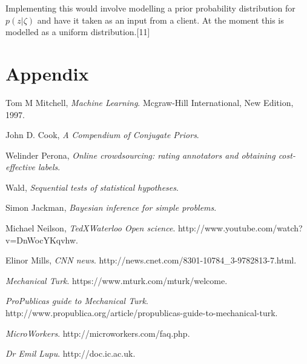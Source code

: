 \documentclass[11pt]{article}
\begin{document}
Implementing this would involve modelling a prior probability distribution for $p(z|\zeta)$ and have it taken as an input from a client. At the moment this is modelled as a uniform distribution.[11]

\section{Appendix}

\begin{thebibliography}{99}

  Tom M Mitchell,
  \emph{Machine Learning}.
  Mcgraw-Hill International,
  New Edition,
  1997.
  
  John D. Cook,
  \emph{A Compendium of Conjugate Priors}.

  Welinder Perona,
  \emph{Online crowdsourcing: rating annotators and obtaining cost-effective labels}.
  
  Wald,
  \emph{Sequential tests of statistical hypotheses}.
  
  Simon Jackman,
  \emph{Bayesian inference for simple problems}.
  
  Michael Neilson,
  \emph{TedXWaterloo Open science}.
  http://www.youtube.com/watch?v=DnWocYKqvhw.

	Elinor Mills,
	\emph{CNN news}.
	http://news.cnet.com/8301-10784\_3-9782813-7.html.   
	
	\emph{Mechanical Turk}.
	https://www.mturk.com/mturk/welcome.	
	
	
	\emph{ProPublicas guide to Mechanical Turk}.
	http://www.propublica.org/article/propublicas-guide-to-mechanical-turk.
	
	\emph{MicroWorkers}.
	http://microworkers.com/faq.php.
	
	\emph{Dr Emil Lupu}.
	http://doc.ic.ac.uk.
  

\end{thebibliography}
\end{document}
